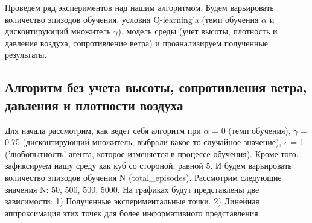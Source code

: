 \documentclass[a4paper]{report}
\theoremstyle{definition}
\theoremstyle{plain}
\theoremstyle{remark}
\theoremstyle{remark}
\theoremstyle{definition}
\begin{document}
Проведем ряд экспериментов над нашим алгоритмом. Будем варьировать количество эпизодов обучения, условия Q-learning'a (темп обучения $\alpha$ и дисконтирующий множитель $\gamma$), модель среды (учет высоты, плотность и давление воздуха, сопротивление ветра) и проанализируем полученные результаты.
\\
\begin{center}
    \subsection{Алгоритм без учета высоты, сопротивления ветра, давления и плотности воздуха}
\end{center}

Для начала рассмотрим, как ведет себя алгоритм при $\alpha$ = 0 (темп обучения), $\gamma$ = 0.75 (дисконтирующий множитель, выбрали какое-то случайное значение), $\epsilon$ = 1 ('любопытность'  агента, которое изменяется в процессе обучения). Кроме того, зафиксируем нашу среду как куб со стороной, равной 5. И будем варьировать количество эпизодов обучения N (total\_episodes). Рассмотрим следующие значения N: 50, 500, 500, 5000. На графиках будут представлены две зависимости: 1) Полученные экспериментальные точки. 2) Линейная аппроксимация этих точек для более информативного представления. 
\end{document}
